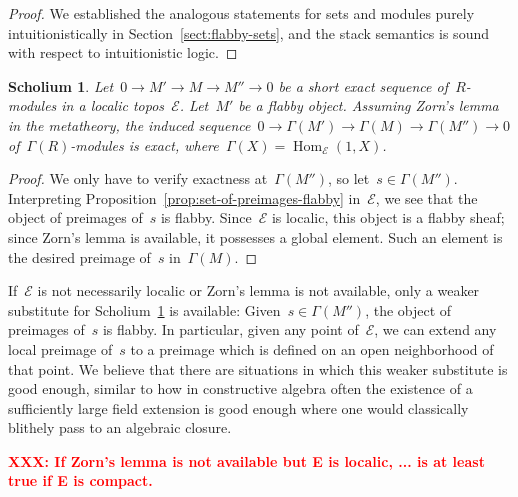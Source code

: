 \documentclass[oneside]{amsart}
\theoremstyle{definition}
\theoremstyle{plain}
\newtheorem{scholium}[defn]{Scholium}
\theoremstyle{remark}
\newcommand{\XXX}[1]{\textbf{\textcolor{red}{XXX: #1}}}
\newcommand{\E}{\mathcal{E}}
\DeclareMathOperator{\Hom}{Hom}
\renewcommand{\_}{\mathpunct{.}\,}
\begin{document}
\begin{proof}We established the analogous statements for sets and modules purely
intuitionistically in Section~\ref{sect:flabby-sets}, and the stack semantics
is sound with respect to intuitionistic logic.
\end{proof}

\begin{scholium}\label{scholium:exact-as-presheaves}
Let~$0 \to M' \to M \to M'' \to 0$ be a short exact sequence
of~$R$-modules in a localic topos~$\E$. Let~$M'$ be a flabby object.
Assuming Zorn's lemma in the metatheory, the induced sequence~$0 \to
\Gamma(M') \to \Gamma(M) \to \Gamma(M'') \to 0$ of~$\Gamma(R)$-modules is exact,
where~$\Gamma(X) = \Hom_\E(1,X)$.\end{scholium}

\begin{proof}We only have to verify exactness at~$\Gamma(M'')$, so let~$s \in
\Gamma(M'')$. Interpreting Proposition~\ref{prop:set-of-preimages-flabby}
in~$\E$, we see that the object of preimages of~$s$ is flabby. Since~$\E$ is
localic, this object is a flabby sheaf; since Zorn's lemma is available, it
possesses a global element. Such an element is the desired preimage of~$s$
in~$\Gamma(M)$.\end{proof}

If~$\E$ is not necessarily localic or Zorn's lemma is not available, only a
weaker substitute for Scholium~\ref{scholium:exact-as-presheaves} is available:
Given~$s \in \Gamma(M'')$, the object of preimages of~$s$ is flabby. In
particular, given any point of~$\E$, we can extend any local preimage of~$s$ to
a preimage which is defined on an open neighborhood of that point. We believe
that there are situations in which this weaker substitute is good enough,
similar to how in constructive algebra often the existence of a sufficiently
large field extension is good enough where one would classically blithely pass
to an algebraic closure.

\XXX{If Zorn's lemma is not available but E is localic, ... is at least true
if E is compact.}
\end{document}
